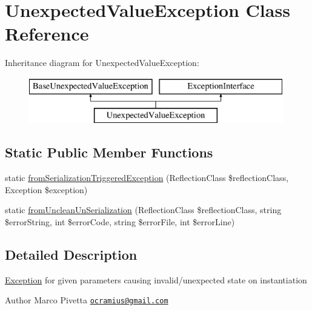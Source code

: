 \hypertarget{class_doctrine_1_1_instantiator_1_1_exception_1_1_unexpected_value_exception}{}\section{Unexpected\+Value\+Exception Class Reference}
\label{class_doctrine_1_1_instantiator_1_1_exception_1_1_unexpected_value_exception}
Inheritance diagram for Unexpected\+Value\+Exception\+:\begin{figure}[H]
\begin{center}
\leavevmode
\includegraphics[height=2.000000cm]{class_doctrine_1_1_instantiator_1_1_exception_1_1_unexpected_value_exception}
\end{center}
\end{figure}
\subsection*{Static Public Member Functions}
\begin{DoxyCompactItemize}
\item 
static \mbox{\hyperlink{class_doctrine_1_1_instantiator_1_1_exception_1_1_unexpected_value_exception_a9c71570f76796ef99f6fd5de9593b008}{from\+Serialization\+Triggered\+Exception}} (Reflection\+Class \$reflection\+Class, Exception \$exception)
\item 
static \mbox{\hyperlink{class_doctrine_1_1_instantiator_1_1_exception_1_1_unexpected_value_exception_a5dc1aea66f9e8525caa04983321a7b04}{from\+Unclean\+Un\+Serialization}} (Reflection\+Class \$reflection\+Class, string \$error\+String, int \$error\+Code, string \$error\+File, int \$error\+Line)
\end{DoxyCompactItemize}


\subsection{Detailed Description}
\mbox{\hyperlink{namespace_doctrine_1_1_instantiator_1_1_exception}{Exception}} for given parameters causing invalid/unexpected state on instantiation

\begin{DoxyAuthor}{Author}
Marco Pivetta \href{mailto:ocramius@gmail.com}{\tt ocramius@gmail.\+com} 
\end{DoxyAuthor}


